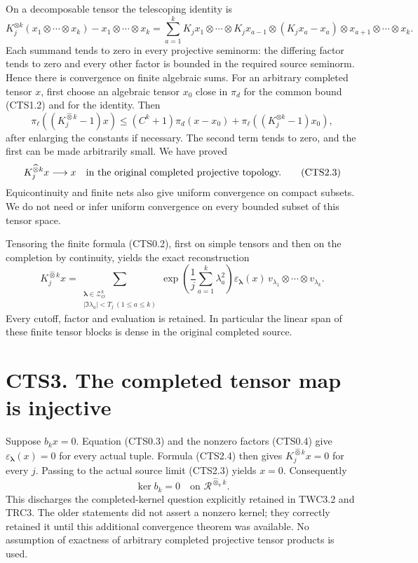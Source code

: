 On a decomposable tensor the telescoping identity is \[
K_j^{\otimes k}(x_1\otimes\cdots\otimes x_k)-x_1\otimes\cdots\otimes x_k
=\sum_{a=1}^k K_jx_1\otimes\cdots\otimes K_jx_{a-1}
\otimes(K_jx_a-x_a)\otimes x_{a+1}\otimes\cdots\otimes x_k.
\tag{CTS2.1}
\] Each summand tends to zero in every projective seminorm: the
differing factor tends to zero and every other factor is bounded in the
required source seminorm. Hence there is convergence on finite algebraic
sums. For an arbitrary completed tensor \(x\), first choose an algebraic
tensor \(x_0\) close in \(\pi_d\) for the common bound (CTS1.2) and for
the identity. Then \[
\pi_\ell((K_j^{\widehat\otimes k}-1)x)
\le(C^k+1)\pi_d(x-x_0)+\pi_\ell((K_j^{\otimes k}-1)x_0),
\tag{CTS2.2}
\] after enlarging the constants if necessary. The second term tends to
zero, and the first can be made arbitrarily small. We have proved \[
K_j^{\widehat\otimes k}x\longrightarrow x\quad\hbox{in the original completed projective topology.}
\tag{CTS2.3}
\] Equicontinuity and finite nets also give uniform convergence on
compact subsets. We do not need or infer uniform convergence on every
bounded subset of this tensor space.

Tensoring the finite formula (CTS0.2), first on simple tensors and then
on the completion by continuity, yields the exact reconstruction \[
K_j^{\widehat\otimes k}x=
\sum_{\substack{\boldsymbol\lambda\in\mathscr Z_O^k\\|\Im\lambda_a|<T_j\ (1\le a\le k)}}
\exp\!\left(\frac1j\sum_{a=1}^k\lambda_a^2\right)
\varepsilon_{\boldsymbol\lambda}(x)
\,v_{\lambda_1}\otimes\cdots\otimes v_{\lambda_k}.
\tag{CTS2.4}
\] Every cutoff, factor and evaluation is retained. In particular the
linear span of these finite tensor blocks is dense in the original
completed source.

\section{CTS3. The completed tensor map is
injective}\label{cts3.-the-completed-tensor-map-is-injective}

Suppose \(b_kx=0\). Equation (CTS0.3) and the nonzero factors (CTS0.4)
give \(\varepsilon_{\boldsymbol\lambda}(x)=0\) for every actual tuple.
Formula (CTS2.4) then gives \(K_j^{\widehat\otimes k}x=0\) for every
\(j\). Passing to the actual source limit (CTS2.3) yields \(x=0\).
Consequently \[
\boxed{\ker b_k=0\quad\text{on }\mathcal R^{\widehat\otimes_\pi k}.}
\tag{CTS3.1}
\] This discharges the completed-kernel question explicitly retained in
TWC3.2 and TRC3. The older statements did not assert a nonzero kernel;
they correctly retained it until this additional convergence theorem was
available. No assumption of exactness of arbitrary completed projective
tensor products is used.

